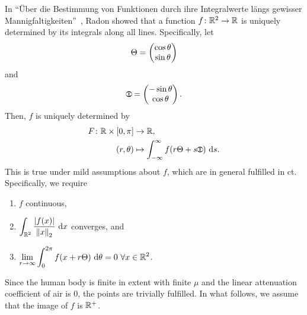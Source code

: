\documentclass[../ml-ct.tex]{subfiles}
\begin{document}
In \enquote{Über die Bestimmung von Funktionen durch ihre Integralwerte längs gewisser Mannigfaltigkeiten}~\cite{radon_bestimmung_1917}, Radon showed that a function \( f\colon\mathbb{R}^2\to\mathbb{R} \) is uniquely determined by its integrals along all lines.
Specifically, let
\begin{equation}
	\Theta = \begin{pmatrix} \cos\theta \\ \sin\theta \end{pmatrix}
\end{equation}
and 
\begin{equation}
	\tcsperp = \begin{pmatrix} -\sin\theta \\ \cos\theta \end{pmatrix}.
\end{equation}
Then, \( f \) is uniquely determined by
\begin{equation}
	\begin{aligned}
		\Func{F}{\R \times [0, \pi]&}{\R}, \\
		(r, \theta) & \mapsto \int_{-\infty}^{\infty} f(r\tcs + s\tcsperp)\ \dd s.
	\end{aligned}%
	\label{eq:image:radon trafo}
\end{equation}
This is true under mild assumptions about \( f \), which are in general fulfilled in \gls{ct}.
Specifically, we require
\begin{enumerate}
	\item \( f \) continuous,
	\item \(\displaystyle \int_{\mathbb{R}^2} \frac{|f(x)|}{\left\lVert x\right\rVert_2}\ \mathrm{d} x \) converges, and
	\item \(\displaystyle \lim_{r\rightarrow \infty} \int_{0}^{2\pi} f(x + r \Theta)\ \mathrm{d} \theta = 0\ \forall x \in \mathbb{R}^2 \).
\end{enumerate}
Since the human body is finite in extent with finite \( \mu \) and the linear attenuation coefficient of air is \num{0}, the points are trivially fulfilled.
In what follows, we assume that the image of \( f \) is \( \mathbb{R}^+ \).
\end{document}
